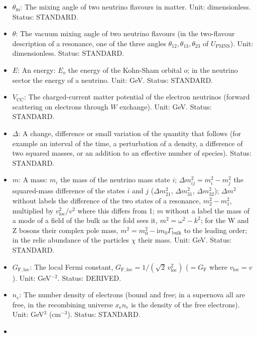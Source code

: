 \documentclass[
  10pt,
]{article}
\providecommand{\tightlist}{%
  \setlength{\itemsep}{0pt}\setlength{\parskip}{0pt}}
\begin{document}
\begin{itemize}
\tightlist
\item
  \(\theta_{\mathrm{m}}\): The mixing angle of two neutrino flavours in
  matter. Unit: dimensionless. Status: STANDARD.
\item
  \(\theta\): The vacuum mixing angle of two neutrino flavours (in the
  two-flavour description of a resonance, one of the three angles
  \(\theta_{12}, \theta_{13}, \theta_{23}\) of \(U_{\mathrm{PMNS}}\)).
  Unit: dimensionless. Status: STANDARD.
\item
  \(E\): An energy: \(E_o\) the energy of the Kohn-Sham orbital \(o\);
  in the neutrino sector the energy of a neutrino. Unit: GeV. Status:
  STANDARD.
\item
  \(V_{\mathrm{CC}}\): The charged-current matter potential of the
  electron neutrinos (forward scattering on electrons through \(W\)
  exchange). Unit: GeV. Status: STANDARD.
\item
  \(\Delta\): A change, difference or small variation of the quantity
  that follows (for example an interval of the time, a perturbation of a
  density, a difference of two squared masses, or an addition to an
  effective number of species). Status: STANDARD.
\item
  \(m\): A mass: \(m_i\) the mass of the neutrino mass state \(i\);
  \(\Delta m_{ij}^2 = m_i^2 - m_j^2\) the squared-mass difference of the
  states \(i\) and \(j\) (\(\Delta m_{21}^2\), \(\Delta m_{31}^2\),
  \(\Delta m_{32}^2\)); \(\Delta m^2\) without labels the difference of
  the two states of a resonance, \(m_2^2 - m_1^2\), multiplied by
  \(v_{\mathrm{loc}}^2/v^2\) where this differs from 1; \(m\) without a
  label the mass of a mode of a field of the bulk as the fold sees it,
  \(m^2 = \omega^2 - k^2\); for the W and Z bosons their complex pole
  mass, \(m^2 = m_0^2 - \mathrm{i}m_0\Gamma_{\mathrm{bulk}}\) to the
  leading order; in the relic abundance of the particles \(\chi\) their
  mass. Unit: GeV. Status: STANDARD.
\item
  \(G_{\mathrm{F,loc}}\): The local Fermi constant,
  \(G_{\mathrm{F,loc}} = 1/(\sqrt2\,v_{\mathrm{loc}}^2)\)
  (\(= G_{\mathrm{F}}\) where \(v_{\mathrm{loc}} = v\)). Unit:
  GeV\(^{-2}\). Status: DERIVED.
\item
  \(n_e\): The number density of electrons (bound and free; in a
  supernova all are free, in the recombining universe
  \(x_{\mathrm{e}}n_e\) is the density of the free electrons). Unit:
  GeV\(^3\) (cm\(^{-3}\)). Status: STANDARD.
\item

\end{itemize}
\end{document}
